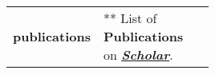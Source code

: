 \documentclass[9pt]{article}
\begin{document}
\begin{longtable}{@{}>{\raggedleft}p{0.25\linewidth}
                          p{}>{}p{0.25\linewidth}@{}}
        \textbf{publications}
            & ** List of \textbf{Publications} on \textit{\href{https://scholar.google.ca/citations?user=zFDREhgAAAAJ\&hl=en}{\textbf{Scholar}}}.\\ [0.5em]


  \end{longtable}
\end{document}
